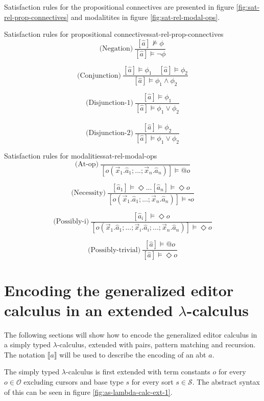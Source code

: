 \documentclass{article}
\begin{document}
Satisfaction rules for the propositional connectives are presented in figure \ref{fig:sat-rel-prop-connectives} and modalitites in figure \ref{fig:sat-rel-modal-ops}.

\begin{myfigure}{Satisfaction rules for propositional connectives}{sat-rel-prop-connectives}
\[ 
\text{(Negation)} \ \frac{[\hat{a}] \not\models \phi}{[\hat{a}] \models \neg \phi}
\]

\[ 
\text{(Conjunction)} \ \frac{[\hat{a}] \models \phi_1 \quad [\hat{a}] \models \phi_2}{[\hat{a}] \models \phi_1 \land \phi_2}
\]

\[ 
\text{(Disjunction-1)} \ \frac{[\hat{a}] \models \phi_1}{[\hat{a}] \models \phi_1 \lor \phi_2}
\]
\\
\[ 
\text{(Disjunction-2)} \ \frac{[\hat{a}] \models \phi_2}{[\hat{a}] \models \phi_1 \lor \phi_2}
\]
\end{myfigure}

\begin{myfigure}{Satisfaction rules for modalities}{sat-rel-modal-ops}
\[ 
\text{(At-op)} \ \frac{}{[o(\vec{x}_1.\hat{a}_1;...;\vec{x}_n.\hat{a}_n)] \models @o}
\]

\[ 
\text{(Necessity)} \ \frac{[\hat{a}_1] \models \Diamond ... [\hat{a}_n] \models \Diamond o}{[o(\vec{x}_1.\hat{a}_1;...;\vec{x}_n.\hat{a}_n)] \models \square o}
\]

\[ 
\text{(Possibly-i)} \ \frac{[\hat{a}_i] \models \Diamond o}{[o(\vec{x}_1.\hat{a}_1;...;\Vec{x}_i.\hat{a}_i;...;\vec{x}_n.\hat{a}_n)] \models \Diamond o}
\]

\[ 
\text{(Possibly-trivial)} \ \frac{[\hat{a}] \models @o}{[\hat{a}] \models \Diamond o}
\]
\end{myfigure}

\section{Encoding the generalized editor calculus in an extended $\lambda$-calculus}
The following sections will show how to encode the generalized editor calculus in a simply typed $\lambda$-calculus, extended with pairs, pattern matching and recursion. The notation $\llbracket a \rrbracket$ will be used to describe the encoding of an abt $a$.  

The simply typed $\lambda$-calculus is first extended with term constants $o$ for every $o \in \mathcal{O}$ excluding cursors and base type $s$ for every sort $s \in \mathcal{S}$. The abstract syntax of this can be seen in figure \ref{fig:as-lambda-calc-ext-1}.
\end{document}
